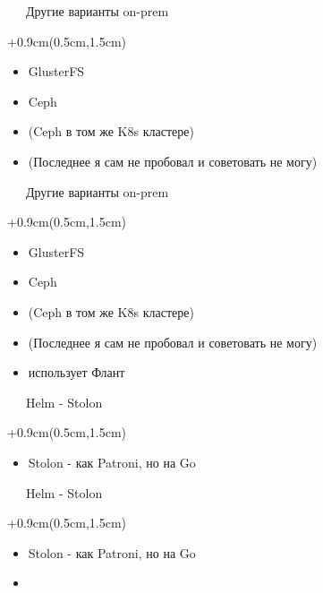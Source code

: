 \documentclass[xetex,18pt,aspectratio=43]{beamer}
\begin{document}
\begin{Large}
\begin{frame}{\ \ \ Другие варианты on-prem}
\begin{textblock*}{\framewidth+0.9cm}(0.5cm,1.5cm)
\begin{itemize}
  \item GlusterFS
  \item Ceph
  \item \href{https://rook.io}{\color{linkcolor}{rook.io}} (Ceph в
    том же K8s кластере)
  \item (Последнее я сам не пробовал и советовать не могу)
\end{itemize}
\end{textblock*}
\end{frame}

\begin{frame}{\ \ \ Другие варианты on-prem}
\begin{textblock*}{\framewidth+0.9cm}(0.5cm,1.5cm)
\begin{itemize}
  \item GlusterFS
  \item Ceph
  \item \href{https://rook.io}{\color{linkcolor}{rook.io}} (Ceph в
    том же K8s кластере)
  \item (Последнее я сам не пробовал и советовать не могу)
  \item \href{https://rook.io}{\color{linkcolor}{rook.io}} использует Флант
\end{itemize}
\end{textblock*}
\end{frame}

\begin{frame}{\ \ \ Helm - Stolon}
\begin{textblock*}{\framewidth+0.9cm}(0.5cm,1.5cm)
\begin{itemize}
  \item Stolon - как Patroni, но на Go
\end{itemize}
\end{textblock*}
\end{frame}

\begin{frame}{\ \ \ Helm - Stolon}
\begin{textblock*}{\framewidth+0.9cm}(0.5cm,1.5cm)
\begin{itemize}
  \item Stolon - как Patroni, но на Go
  \item \href{https://github.com/alexclear/k8s-stolon-lab}{\color{linkcolor}{github.com/alexclear/k8s-stolon-lab}}
\end{itemize}
\end{textblock*}
\end{frame}


\end{Large}
\end{document}
